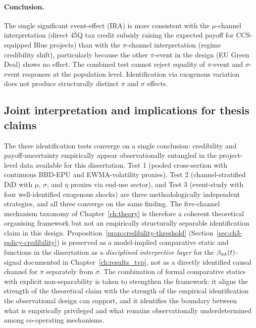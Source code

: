 \paragraph{Conclusion.} The single significant event-effect (IRA) is more consistent with the $\mu$-channel interpretation (direct 45Q tax credit subsidy raising the expected payoff for CCS-equipped Blue projects) than with the $\pi$-channel interpretation (regime credibility shift), particularly because the other $\pi$-event in the design (EU Green Deal) shows no effect. The combined test cannot reject equality of $\pi$-event and $\sigma$-event responses at the population level. Identification via exogenous variation does not produce structurally distinct $\pi$ and $\sigma$ effects.

\subsection*{Joint interpretation and implications for thesis claims}

The three identification tests converge on a single conclusion: credibility and payoff-uncertainty empirically appear observationally entangled in the project-level data available for this dissertation. Test 1 (pooled cross-section with continuous BBD-EPU and EWMA-volatility proxies), Test 2 (channel-stratified DiD with $\mu$, $\sigma$, and $\eta$ proxies via end-use sector), and Test 3 (event-study with four well-identified exogenous shocks) are three methodologically independent strategies, and all three converge on the same finding. The five-channel mechanism taxonomy of Chapter~\ref{ch:theory} is therefore a coherent theoretical organising framework but not an empirically structurally separable identification claim in this design. Proposition~\ref{prop:credibility-threshold} (Section~\ref{sec:ch3-policy-credibility}) is preserved as a model-implied comparative static and functions in the dissertation as a \emph{disciplined interpretive layer} for the $\beta_{\mathrm{int}}(t)$-signal documented in Chapter~\ref{ch:results_tvp}, not as a directly identified causal channel for $\pi$ separately from $\sigma$. The combination of formal comparative statics with explicit non-separability is taken to strengthen the framework: it aligns the strength of the theoretical claim with the strength of the empirical identification the observational design can support, and it identifies the boundary between what is empirically privileged and what remains observationally underdetermined among co-operating mechanisms.

